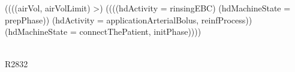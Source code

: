 \begin{circus}
\begin{block}
\begin{block}
			\end{block}\\
			 \extchoice \\
			\begin{block}
				\lcircguard \lnot ((((airVol, airVolLimit) \in >) \land ((((hdActivity = {rinsingEBC}) \land (hdMachineState = {prepPhase})) \lor (hdActivity = {applicationArterialBolus, reinfProcess})) \lor (hdMachineState = {connectThePatient, initPhase})))) \rcircguard \circguard \\
					\begin{block}
						\Skip\\ \circseq R2832
					\end{block}\\
					
			\end{block}\\
			
	\end{block}\\
	

\end{circus}
